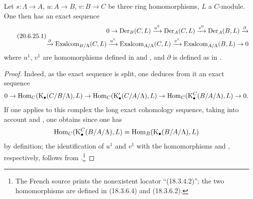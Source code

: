 \begin{proposition}[20.6.25]
\label{0.20.6.25}
Let $s:\Lambda\to A$, $u:A\to B$, $v:B\to C$ be three ring homomorphisms, $L$ a $C$-module.
One then has an exact sequence
\begin{equation}
\tag{20.6.25.1}
  \label{0.20.6.25.1}
\begin{split}
  0\to\operatorname{Der}_B(C,L)\xrightarrow{u^0}\operatorname{Der}_A(C,L)\xrightarrow{v^0}\operatorname{Der}_A(B,L)\xrightarrow{\partial} \\
  \xrightarrow{\partial}\operatorname{Exalcom}_{B/\Lambda}(C,L)\xrightarrow{u^1}\operatorname{Exalcom}_{A/\Lambda}(C,L)\xrightarrow{v^1}\operatorname{Exalcom}_{A/\Lambda}(B,L)\to 0
\end{split}
\end{equation}
where $u^1$, $v^1$ are homomorphisms defined in  and , and $\partial$ is defined as in \textup{}.
\end{proposition}

\begin{proof}
Indeed, as the exact sequence  is split, one deduces from it an exact sequence
\[
  0\to\operatorname{Hom}_C(\mathrm{K}_\bullet(C/B/\Lambda),L)\to\operatorname{Hom}_C(\mathrm{K}'_\bullet(C/A/\Lambda),L)\to\operatorname{Hom}_C(\mathrm{K}^C_\bullet(B/A/\Lambda),L)\to 0.
\]
If one applies to this complex the long exact cohomology sequence, taking into account  and , one obtains  since one has
\[
  \operatorname{Hom}_C(\mathrm{K}^C_\bullet(B/A/\Lambda),L)=\operatorname{Hom}_B(\mathrm{K}_\bullet(B/A/\Lambda),L)
\]
by definition; the identification of $u^1$ and $v^1$ with the homomorphisms  and , respectively, follows from .\footnote{The French source prints the nonexistent locator ``(18.3.4.2)''; the two homomorphisms are defined in (18.3.6.4) and (18.3.6.2).}
\end{proof}

